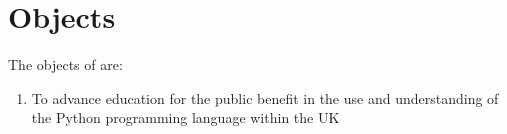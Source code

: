 \section{Objects}\label{sec:objects}
The objects of \shortname{} are:
\begin{enumerate}
    \item To advance education for the public benefit in the use and understanding of the Python programming language within the UK 
\end{enumerate}
